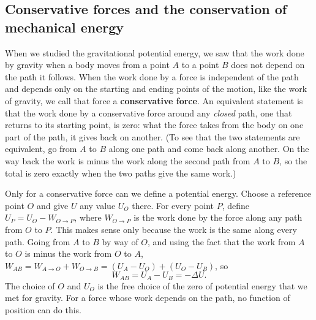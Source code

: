 \documentclass[11pt,a4paper]{article}
\begin{document}
\subsection{Conservative forces and the conservation of mechanical energy}\label{sec:conservative}

When we studied the gravitational potential energy, we saw that the work done by gravity when a
body moves from a point $A$ to a point $B$ does not depend on the path it follows. When the work
done by a force is independent of the path and depends only on the starting and ending points of
the motion, like the work of gravity, we call that force a \textbf{conservative force}. An
equivalent statement is that the work done by a conservative force around any \emph{closed} path,
one that returns to its starting point, is zero: what the force takes from the body on one part of
the path, it gives back on another. (To see that the two statements are equivalent, go from $A$ to
$B$ along one path and come back along another. On the way back the work is minus the work along
the second path from $A$ to $B$, so the total is zero exactly when the two paths give the same
work.)

Only for a conservative force can we define a potential energy. Choose a reference point $O$ and
give $U$ any value $U_O$ there. For every point $P$, define $U_P = U_O - W_{O\to P}$, where
$W_{O\to P}$ is the work done by the force along any path from $O$ to $P$. This makes sense only
because the work is the same along every path. Going from $A$ to $B$ by way of $O$, and using the
fact that the work from $A$ to $O$ is minus the work from $O$ to $A$,
$W_{AB} = W_{A\to O} + W_{O\to B} = (U_A - U_O) + (U_O - U_B)$, so
\[
  W_{AB} = U_A - U_B = -\Delta U .
\]
The choice of $O$ and $U_O$ is the free choice of the zero of potential energy that we met for
gravity. For a force whose work depends on the path, no function of position can do this.
\end{document}
